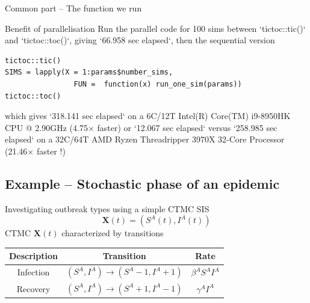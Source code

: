 \documentclass[aspectratio=169]{beamer}\usepackage[]{graphicx}\usepackage[]{xcolor}
\newenvironment{knitrout}{}{} %
\begin{document}
\begin{frame}{Common part -- The function we run}
\begin{knitrout}
\end{knitrout}

\end{frame}

\begin{frame}

\end{frame}


\begin{frame}[fragile]{Benefit of parallelisation}
    Run the parallel code for 100 sims between `tictoc::tic()` and `tictoc::toc()`, giving `66.958 sec elapsed`, then the sequential version
\begin{lstlisting}
tictoc::tic()
SIMS = lapply(X = 1:params$number_sims,
                FUN =  function(x) run_one_sim(params))
tictoc::toc()
\end{lstlisting}
    which gives `318.141 sec elapsed` on a 6C/12T Intel(R) Core(TM) i9-8950HK CPU @ 2.90GHz (4.75$\times$ faster) or `12.067 sec elapsed` versus `258.985 sec elapsed` on a 32C/64T AMD Ryzen Threadripper 3970X 32-Core Processor (21.46$\times$ faster !)
\end{frame}


\subsection{Example -- Stochastic phase of an epidemic}

\nocite{ArinoMilliken2022b}


\begin{frame}{Investigating outbreak types using a simple CTMC SIS}
\[
\mathbf{X}(t)=\left(S^A(t),I^A(t)\right)
\]
\vfill
CTMC $\mathbf{X}(t)$ characterized by transitions
\begin{center}
  \begin{tabular}{ccc}
    \toprule
    Description & Transition & Rate \\
    \midrule
    Infection & $\left(S^A,I^A\right)\to \left(S^A-1,I^A+1\right)$ & $\beta^AS^AI^A$ \\
    Recovery & $\left(S^A,I^A\right)\to \left(S^A+1,I^A-1\right)$ & $\gamma^AI^A$ \\
    \bottomrule
  \end{tabular}
\end{center}
\end{frame}
\end{document}
